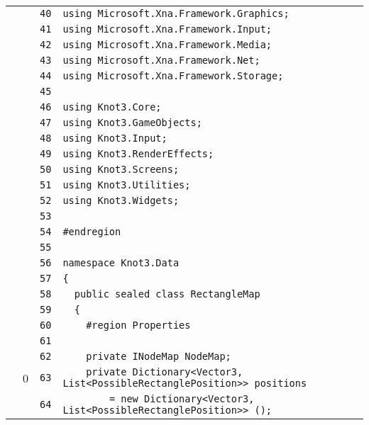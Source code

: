 \documentclass[a4paper,10pt]{article}
\begin{document}
\begin{longtable}[l]{lrrl}
\cellcolor{gray} &  & \verb~40~ & \verb~using Microsoft.Xna.Framework.Graphics;~\\
\cellcolor{gray} &  & \verb~41~ & \verb~using Microsoft.Xna.Framework.Input;~\\
\cellcolor{gray} &  & \verb~42~ & \verb~using Microsoft.Xna.Framework.Media;~\\
\cellcolor{gray} &  & \verb~43~ & \verb~using Microsoft.Xna.Framework.Net;~\\
\cellcolor{gray} &  & \verb~44~ & \verb~using Microsoft.Xna.Framework.Storage;~\\
\cellcolor{gray} &  & \verb~45~ & \verb~~\\
\cellcolor{gray} &  & \verb~46~ & \verb~using Knot3.Core;~\\
\cellcolor{gray} &  & \verb~47~ & \verb~using Knot3.GameObjects;~\\
\cellcolor{gray} &  & \verb~48~ & \verb~using Knot3.Input;~\\
\cellcolor{gray} &  & \verb~49~ & \verb~using Knot3.RenderEffects;~\\
\cellcolor{gray} &  & \verb~50~ & \verb~using Knot3.Screens;~\\
\cellcolor{gray} &  & \verb~51~ & \verb~using Knot3.Utilities;~\\
\cellcolor{gray} &  & \verb~52~ & \verb~using Knot3.Widgets;~\\
\cellcolor{gray} &  & \verb~53~ & \verb~~\\
\cellcolor{gray} &  & \verb~54~ & \verb~#endregion~\\
\cellcolor{gray} &  & \verb~55~ & \verb~~\\
\cellcolor{gray} &  & \verb~56~ & \verb~namespace Knot3.Data~\\
\cellcolor{gray} &  & \verb~57~ & \verb~{~\\
\cellcolor{gray} &  & \verb~58~ & \verb~  public sealed class RectangleMap~\\
\cellcolor{gray} &  & \verb~59~ & \verb~  {~\\
\cellcolor{gray} &  & \verb~60~ & \verb~    #region Properties~\\
\cellcolor{gray} &  & \verb~61~ & \verb~~\\
\cellcolor{gray} &  & \verb~62~ & \verb~    private INodeMap NodeMap;~\\
\cellcolor{red} & 0 & \verb~63~ & \verb~    private Dictionary<Vector3, List<PossibleRectanglePosition>> positions~\\
\cellcolor{gray} &  & \verb~64~ & \verb~        = new Dictionary<Vector3, List<PossibleRectanglePosition>> ();~\\

\end{longtable}
\end{document}
